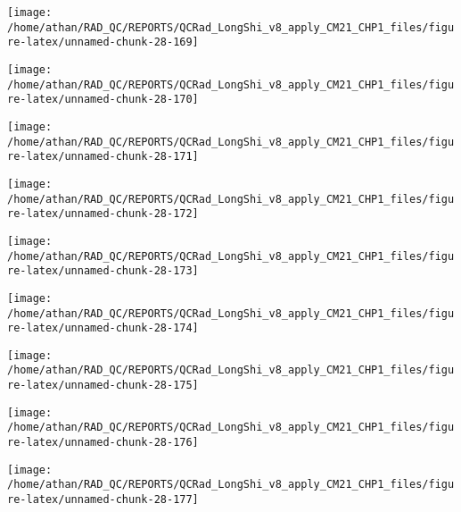 \documentclass[
  10pt,
  a4paper,oneside]{article}
\begin{document}
\begin{center}\texttt{[image: /home/athan/RAD\_QC/REPORTS/QCRad\_LongShi\_v8\_apply\_CM21\_CHP1\_files/figure-latex/unnamed-chunk-28-169]} \end{center}

\begin{center}\texttt{[image: /home/athan/RAD\_QC/REPORTS/QCRad\_LongShi\_v8\_apply\_CM21\_CHP1\_files/figure-latex/unnamed-chunk-28-170]} \end{center}

\begin{center}\texttt{[image: /home/athan/RAD\_QC/REPORTS/QCRad\_LongShi\_v8\_apply\_CM21\_CHP1\_files/figure-latex/unnamed-chunk-28-171]} \end{center}

\begin{center}\texttt{[image: /home/athan/RAD\_QC/REPORTS/QCRad\_LongShi\_v8\_apply\_CM21\_CHP1\_files/figure-latex/unnamed-chunk-28-172]} \end{center}

\begin{center}\texttt{[image: /home/athan/RAD\_QC/REPORTS/QCRad\_LongShi\_v8\_apply\_CM21\_CHP1\_files/figure-latex/unnamed-chunk-28-173]} \end{center}

\begin{center}\texttt{[image: /home/athan/RAD\_QC/REPORTS/QCRad\_LongShi\_v8\_apply\_CM21\_CHP1\_files/figure-latex/unnamed-chunk-28-174]} \end{center}

\begin{center}\texttt{[image: /home/athan/RAD\_QC/REPORTS/QCRad\_LongShi\_v8\_apply\_CM21\_CHP1\_files/figure-latex/unnamed-chunk-28-175]} \end{center}

\begin{center}\texttt{[image: /home/athan/RAD\_QC/REPORTS/QCRad\_LongShi\_v8\_apply\_CM21\_CHP1\_files/figure-latex/unnamed-chunk-28-176]} \end{center}

\begin{center}\texttt{[image: /home/athan/RAD\_QC/REPORTS/QCRad\_LongShi\_v8\_apply\_CM21\_CHP1\_files/figure-latex/unnamed-chunk-28-177]} \end{center}
\end{document}
